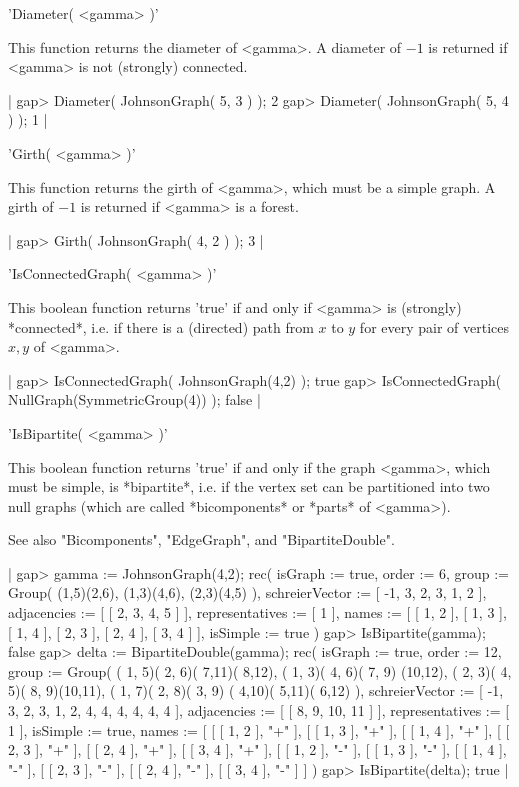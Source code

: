 'Diameter( <gamma> )'

This  function  returns the  diameter of <gamma>.  A diameter of $-1$  is
returned if <gamma> is not (strongly) connected.

|    gap> Diameter( JohnsonGraph( 5, 3 ) );
    2
    gap> Diameter( JohnsonGraph( 5, 4 ) );
    1 |


'Girth( <gamma> )'

This function returns the girth of <gamma>, which must be a simple graph.
A girth of $-1$ is returned if <gamma> is a forest.

|    gap> Girth( JohnsonGraph( 4, 2 ) );
    3 |


'IsConnectedGraph( <gamma> )'

This boolean function returns 'true' if and only if <gamma> is (strongly)
*connected*, i.e. if there is a (directed) path from $x$ to $y$ for every
pair of vertices $x,y$ of <gamma>.

|    gap> IsConnectedGraph( JohnsonGraph(4,2) );
    true
    gap> IsConnectedGraph( NullGraph(SymmetricGroup(4)) );
    false |


'IsBipartite( <gamma> )'

This boolean function  returns 'true' if  and  only if the graph <gamma>,
which  must  be simple, is *bipartite*, i.e.  if  the vertex  set can  be
partitioned into two null  graphs  (which  are  called  *bicomponents* or
*parts* of <gamma>).

See also "Bicomponents", "EdgeGraph", and "BipartiteDouble".

|    gap> gamma := JohnsonGraph(4,2);
    rec(
      isGraph := true,
      order := 6,
      group := Group( (1,5)(2,6), (1,3)(4,6), (2,3)(4,5) ),
      schreierVector := [ -1, 3, 2, 3, 1, 2 ],
      adjacencies := [ [ 2, 3, 4, 5 ] ],
      representatives := [ 1 ],
      names := [ [ 1, 2 ], [ 1, 3 ], [ 1, 4 ], [ 2, 3 ], [ 2, 4 ],
          [ 3, 4 ] ],
      isSimple := true )
    gap> IsBipartite(gamma);
    false
    gap> delta := BipartiteDouble(gamma);
    rec(
      isGraph := true,
      order := 12,
      group := Group( ( 1, 5)( 2, 6)( 7,11)( 8,12), ( 1, 3)( 4, 6)( 7, 9)
        (10,12), ( 2, 3)( 4, 5)( 8, 9)(10,11), ( 1, 7)( 2, 8)( 3, 9)
        ( 4,10)( 5,11)( 6,12) ),
      schreierVector := [ -1, 3, 2, 3, 1, 2, 4, 4, 4, 4, 4, 4 ],
      adjacencies := [ [ 8, 9, 10, 11 ] ],
      representatives := [ 1 ],
      isSimple := true,
      names := [ [ [ 1, 2 ], "+" ], [ [ 1, 3 ], "+" ], [ [ 1, 4 ], "+" ],
          [ [ 2, 3 ], "+" ], [ [ 2, 4 ], "+" ], [ [ 3, 4 ], "+" ],
          [ [ 1, 2 ], "-" ], [ [ 1, 3 ], "-" ], [ [ 1, 4 ], "-" ],
          [ [ 2, 3 ], "-" ], [ [ 2, 4 ], "-" ], [ [ 3, 4 ], "-" ] ] )
    gap> IsBipartite(delta);
    true |

